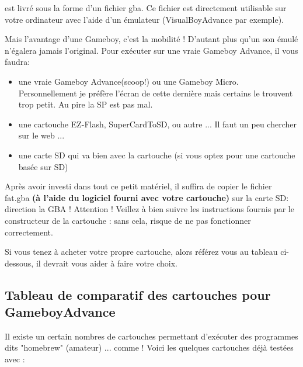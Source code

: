 \documentclass[12pt,a4paper]{article}
\begin{document}
    \FAT est livré sous la forme d'un fichier gba.
    Ce fichier est directement utilisable sur votre ordinateur avec l'aide d'un émulateur (VisualBoyAdvance par exemple).
    \medskip
    
    Mais l'avantage d'une Gameboy, c'est la mobilité !
    D'autant plus qu'un son émulé n'égalera jamais l'original.
    Pour exécuter \FAT sur une vraie Gameboy Advance, il vous faudra:
    \begin{itemize}
        \item{une vraie Gameboy Advance(scoop!) ou une Gameboy Micro. Personnellement je préfère l'écran de cette dernière mais certains le trouvent trop petit. Au pire la SP est pas mal.}
        \item{une cartouche EZ-Flash, SuperCardToSD, ou autre ... Il faut un peu chercher sur le web ...}
        \item{une carte SD qui va bien avec la cartouche (si vous optez pour une cartouche basée sur SD)} 
    \end{itemize}\medskip
    
    Après avoir investi dans tout ce petit matériel, il suffira de copier le fichier fat.gba {\bf (à l'aide du logiciel fourni avec votre cartouche)} sur la carte SD: direction la GBA !
    Attention ! Veillez à bien suivre les instructions fournis par le constructeur de la cartouche : sans cela, \FAT risque de ne pas fonctionner correctement.
    
    
    Si vous tenez à acheter votre propre cartouche, alors référez vous au tableau ci-dessous, il devrait vous aider à faire votre choix.
    
    \subsection{Tableau de comparatif des cartouches pour GameboyAdvance}
    
    Il existe un certain nombres de cartouches permettant d'exécuter des programmes dits "homebrew" (amateur) ... comme \FAT !
    Voici les quelques cartouches déjà testées avec \FAT :
    \medskip
\end{document}
